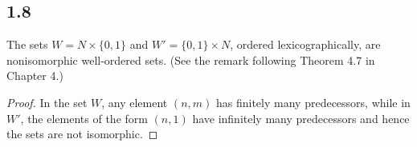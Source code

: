 \subsection*{1.8} The sets $W = N \times \{0, 1\}$ and $W' = \{0, 1\} \times N$, ordered lexicographically, are nonisomorphic well-ordered sets. (See the remark following Theorem 4.7 in Chapter 4.)

\begin{proof}
    In the set $W$, any element $(n,m)$ has finitely many predecessors, while in $W'$, the elements of the form $(n,1)$ have infinitely many predecessors and hence the sets are not isomorphic.
\end{proof}

